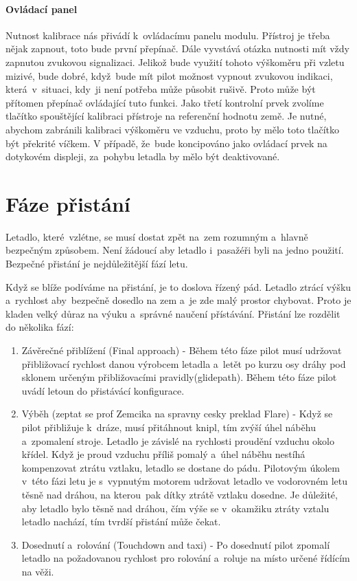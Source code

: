 			\paragraph{Ovládací panel}
				Nutnost kalibrace nás přivádí k~ovládacímu panelu modulu. Přístroj je třeba nějak zapnout, toto bude první přepínač. Dále vyvstává otázka nutnosti mít vždy zapnutou zvukovou signalizaci. Jelikož bude využití tohoto výškoměru při vzletu mizivé, bude dobré, když~bude mít pilot možnost vypnout zvukovou indikaci, která~v~situaci, kdy~ji není potřeba může působit rušivě. Proto může být přítomen přepínač ovládající tuto funkci. Jako třetí kontrolní prvek zvolíme tlačítko spouštějící kalibraci přístroje na referenční hodnotu země. Je nutné, abychom zabránili kalibraci výškoměru ve vzduchu, proto by mělo toto tlačítko být překrité víčkem. V případě, že~bude koncipováno jako ovládací prvek na dotykovém displeji, za~pohybu letadla by mělo být deaktivované.
				
	\section{Fáze přistání}
		Letadlo, které~vzlétne, se musí dostat zpět na~zem rozumným a~hlavně bezpečným způsobem. Není žádoucí aby letadlo i~pasažéři byli na jedno použití. Bezpečné přistání je nejdůležitější fází letu.\par
		Když se blíže podíváme na přistání, je to doslova řízený pád. Letadlo ztrácí výšku a~rychlost aby~bezpečně dosedlo na zem a~je zde malý prostor chybovat. Proto je kladen velký důraz na výuku a~správné naučení přístávání. Přistání lze rozdělit do několika fází\cite{landingPhases}:
			
		\begin{enumerate}
			\item Závěrečné přiblížení (Final approach) - Během této fáze pilot musí udržovat přibližovací rychlost danou výrobcem letadla a~letět po kurzu osy dráhy pod sklonem určeným přibližovacími pravidly(glidepath).
					Během této fáze pilot uvádí letoun do přistávácí konfigurace.
					
					\item Výběh (zeptat se prof Zemcika na spravny cesky preklad Flare) - Když se pilot přibližuje k~dráze, musí přitáhnout knipl, tím zvýší úhel náběhu a~zpomalení stroje. Letadlo je závislé na rychlosti proudění vzduchu okolo křídel. Když je proud vzduchu příliš pomalý a~úhel náběhu nestíhá kompenzovat ztrátu vztlaku, letadlo se dostane do pádu. Pilotovým úkolem v~této fázi letu je s~vypnutým motorem udržovat letadlo ve vodorovném letu těsně nad dráhou, na kterou~pak dítky ztrátě vztlaku dosedne. Je důležité, aby letadlo bylo těsně nad dráhou, čím výše se v~okamžiku ztráty vztalu letadlo nachází, tím tvrdší přistání může čekat.
					
					\item Dosednutí a~rolování (Touchdown and taxi) - Po dosednutí pilot zpomalí letadlo na požadovanou rychlost pro rolování a~roluje na místo určené řídícím na věži. 
				\end{enumerate}
				

